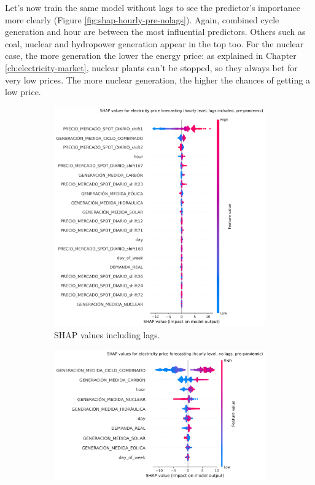 Let's now train the same model without lags to see the predictor's importance more clearly (Figure \ref{fig:shap-hourly-pre-nolags}). Again, combined cycle generation and hour are between the most influential predictors. Others such as coal, nuclear and hydropower generation appear in the top too. For the nuclear case, the more generation the lower the energy price: as explained in Chapter \ref{ch:electricity-market}, nuclear plants can't be stopped, so they always bet for very low prices. The more nuclear generation, the higher the chances of getting a low price.

\begin{figure}[H]
\centering
    \begin{subfigure}[t]{.45\textwidth}
        \centering
        \includegraphics[width=1\linewidth]{images/analysis/shap-hourly-pre}
        \caption{SHAP values including lags.}
        \label{fig:shap-hourly-pre-lags}
    \end{subfigure}
    \begin{subfigure}[t]{.45\textwidth}
        \centering
        \includegraphics[width=1\linewidth]{images/analysis/shap-hourly-pre-nolags}

\end{subfigure}
\end{figure}
